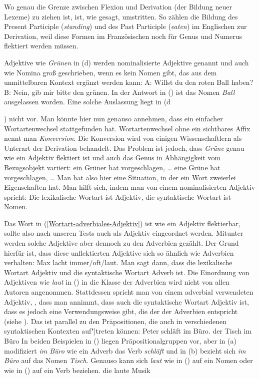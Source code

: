 \documentclass[ number=45
			   ,series=eotms
			   ,printondemand
			  ]{langsci}
\newcommand{\page}{S.\,}
\let\citew=\citealp
\begin{document}
{Wo genau die Grenze zwischen Flexion und Derivation (der Bildung neuer Lexeme) zu ziehen ist, ist,
wie gesagt, umstritten. So zählen \citet*[\page263--264]{SWB2003a} die Bildung des Present Participle (\emph{standing})
und des Past Participle (\emph{eaten}) im Englischen zur Derivation, weil diese Formen im
Französischen noch für Genus und Numerus flektiert werden müssen. 

Adjektive wie \emph{Grünen} in (d) werden nominalisierte Adjektive genannt und auch
wie Nomina groß geschrieben, wenn es kein Nomen gibt, das aus dem unmittelbaren Kontext ergänzt
werden kann:
\ea
A: Willst du den roten Ball haben?\\
B: Nein, gib mir bitte den grünen.
\z
In der Antwort in () ist das Nomen \emph{Ball} ausgelassen worden. Eine solche Auslassung
liegt in (d}) nicht vor. Man könnte hier nun genauso annehmen, dass ein einfacher
Wortartenwechsel stattgefunden hat. Wortartenwechsel ohne ein sichtbares Affix nennt man
\emph{Konversion}. Die Konversion wird von einigen Wissenschaftlern als Unterart der
Derivation behandelt. 
Das Problem ist jedoch, dass \emph{Grüne} genau wie ein Adjektiv flektiert ist und auch das
Genus in Abhängigkeit vom Bezugsobjekt variiert:
\eal
\ex ein Grüner hat vorgeschlagen, \ldots
\ex eine Grüne hat vorgeschlagen, \ldots
\zl
Man hat also hier eine Situation, in der ein Wort zweierlei Eigenschaften hat. Man hilft sich, indem
man von einem nominalisierten Adjektiv spricht: Die lexikalische Wortart ist Adjektiv, die
syntaktische Wortart ist Nomen.

Das Wort in (\ref{Wortart-adverbiales-Adjektiv}) ist wie ein Adjektiv flektierbar, sollte also nach
unseren Tests auch als Adjektiv eingeordnet werden. Mitunter werden solche Adjektive aber dennoch zu
den Adverbien gezählt. Der Grund hierfür ist, dass diese unflektierten Adjektive sich so ähnlich
wie Adverbien verhalten:
\ea
Max lacht immer/oft/laut.
\z
Man sagt dann, dass die lexikalische Wortart Adjektiv und die syntaktische Wortart Adverb ist. Die
Einordnung von Adjektiven wie \emph{laut} in () in die Klasse der Adverbien wird nicht von
allen Autoren angenommen. Stattdessen spricht man von einem adverbial verwendeten Adjektiv, \dash,
dass man annimmt, dass auch die syntaktische Wortart Adjektiv ist, dass es jedoch eine
Verwendungsweise gibt, die der der Adverbien entspricht (siehe \zb
\citew[Abschnitt~7.3]{Eisenberg2004a}). Das ist parallel zu den Präpositionen, die auch in
verschiedenen syntaktischen Kontexten auf"|treten können: 
\eal
\ex Peter schläft im Büro.
\ex der Tisch im Büro
\zl
In beiden Beispielen in () liegen Präpositionalgruppen vor, aber in (a) modifiziert
\emph{im Büro} wie ein Adverb das Verb \emph{schläft} und in (b) bezieht sich \emph{im Büro}
auf das Nomen \emph{Tisch}. Genauso kann sich \emph{laut} wie in () auf ein Nomen oder wie in
() auf ein Verb beziehen.
\ea
die laute Musik
\z 
\end{document}
